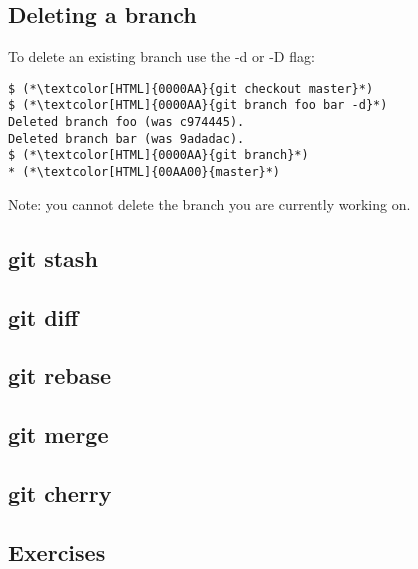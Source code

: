 \subsection{Deleting a branch}
\begin{frame}[fragile]
    \subslidetitle
To delete an existing branch use the -d or -D flag:
\begin{lstlisting}
$ (*\textcolor[HTML]{0000AA}{git checkout master}*)
$ (*\textcolor[HTML]{0000AA}{git branch foo bar -d}*)
Deleted branch foo (was c974445).
Deleted branch bar (was 9adadac).
$ (*\textcolor[HTML]{0000AA}{git branch}*)
* (*\textcolor[HTML]{00AA00}{master}*)
\end{lstlisting}

Note: you cannot delete the branch you are currently working on.

\end{frame}

\subsection{git stash}
\begin{frame}[fragile]
    \subslidetitle
\end{frame}

\subsection{git diff}
\begin{frame}[fragile]
    \subslidetitle
\end{frame}

\subsection{git rebase}
\begin{frame}[fragile]
    \subslidetitle
\end{frame}

\subsection{git merge}
\begin{frame}[fragile]
    \subslidetitle
\end{frame}

\subsection{git cherry}
\begin{frame}[fragile]
    \subslidetitle
\end{frame}

\subsection{Exercises}
\begin{frame}[fragile]
  \subslidetitle
\end{frame}
